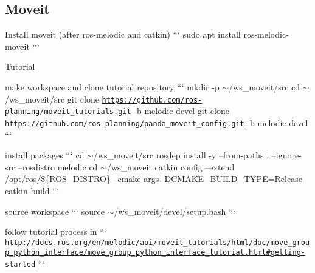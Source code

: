 \subsection*{Moveit}


\begin{DoxyItemize}
\item Install moveit (after ros-\/melodic and catkin) ``` sudo apt install ros-\/melodic-\/moveit ```
\item Tutorial
\begin{DoxyItemize}
\item make workspace and clone tutorial repository ``` mkdir -\/p $\sim$/ws\+\_\+moveit/src cd $\sim$/ws\+\_\+moveit/src git clone \href{https://github.com/ros-planning/moveit_tutorials.git}{\tt https\+://github.\+com/ros-\/planning/moveit\+\_\+tutorials.\+git} -\/b melodic-\/devel git clone \href{https://github.com/ros-planning/panda_moveit_config.git}{\tt https\+://github.\+com/ros-\/planning/panda\+\_\+moveit\+\_\+config.\+git} -\/b melodic-\/devel ```
\item install packages ``` cd $\sim$/ws\+\_\+moveit/src rosdep install -\/y --from-\/paths . --ignore-\/src --rosdistro melodic cd $\sim$/ws\+\_\+moveit catkin config --extend /opt/ros/\$\{R\+O\+S\+\_\+\+D\+I\+S\+T\+RO\} --cmake-\/args -\/\+D\+C\+M\+A\+K\+E\+\_\+\+B\+U\+I\+L\+D\+\_\+\+T\+Y\+PE=Release catkin build ```
\item source workspace ``` source $\sim$/ws\+\_\+moveit/devel/setup.bash ```
\item follow tutorial process in ``` \href{http://docs.ros.org/en/melodic/api/moveit_tutorials/html/doc/move_group_python_interface/move_group_python_interface_tutorial.html#getting-started}{\tt http\+://docs.\+ros.\+org/en/melodic/api/moveit\+\_\+tutorials/html/doc/move\+\_\+group\+\_\+python\+\_\+interface/move\+\_\+group\+\_\+python\+\_\+interface\+\_\+tutorial.\+html\#getting-\/started} ``` 
\end{DoxyItemize}
\end{DoxyItemize}